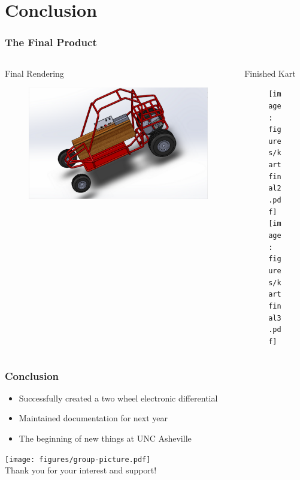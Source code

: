 \documentclass{beamer}
\begin{document}
\section{Conclusion}
\begin{frame}
	\frametitle{The Final Product}
	\begin{columns}[T]
		\begin{column}{0.5\textwidth}
			\begin{block}{Final Rendering}
				\begin{figure}
					\centering
					\includegraphics[scale=.25]{figures/kartfinal1.pdf}
				\end{figure}
			\end{block}
		\end{column}		
		\begin{column}{0.5\textwidth}
			\begin{block}{Finished Kart}
				\begin{figure}
					\centering
					\texttt{[image: figures/kartfinal2.pdf]}
					\\
					\texttt{[image: figures/kartfinal3.pdf]}
				\end{figure}
			\end{block}	
		\end{column}
	\end{columns}		
\end{frame}
\begin{frame}
	\frametitle{Conclusion}
		\begin{itemize}
			\item Successfully created a two wheel electronic differential
			\item Maintained documentation for next year
			\item The beginning of new things at UNC Asheville
		\end{itemize}
	\centering
	\texttt{[image: figures/group-picture.pdf]} \\
Thank you for your interest and support!
\end{frame}
\end{document}
